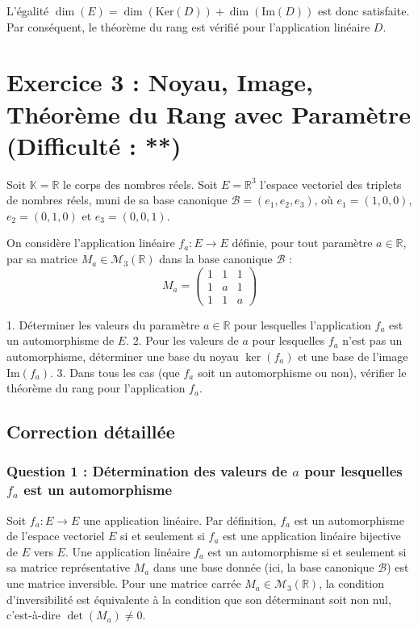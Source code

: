 \documentclass{report}
\begin{document}
    L'égalité $\dim(E) = \dim(\text{Ker}(D)) + \dim(\text{Im}(D))$ est donc satisfaite.
    Par conséquent, le théorème du rang est vérifié pour l'application linéaire $D$.

\newpage

\chapter*{Exercice 3 : Noyau, Image, Théorème du Rang avec Paramètre (Difficulté : **)}

Soit $\mathbb{K} = \mathbb{R}$ le corps des nombres réels.
Soit $E = \mathbb{R}^3$ l'espace vectoriel des triplets de nombres réels, muni de sa base canonique $\mathcal{B} = (e_1, e_2, e_3)$, où $e_1 = (1, 0, 0)$, $e_2 = (0, 1, 0)$ et $e_3 = (0, 0, 1)$.

On considère l'application linéaire $f_a: E \to E$ définie, pour tout paramètre $a \in \mathbb{R}$, par sa matrice $M_a \in \mathcal{M}_3(\mathbb{R})$ dans la base canonique $\mathcal{B}$ :
$$M_a = \begin{pmatrix} 1 & 1 & 1 \\ 1 & a & 1 \\ 1 & 1 & a \end{pmatrix}$$

1.  Déterminer les valeurs du paramètre $a \in \mathbb{R}$ pour lesquelles l'application $f_a$ est un automorphisme de $E$.
2.  Pour les valeurs de $a$ pour lesquelles $f_a$ n'est pas un automorphisme, déterminer une base du noyau $\ker(f_a)$ et une base de l'image $\text{Im}(f_a)$.
3.  Dans tous les cas (que $f_a$ soit un automorphisme ou non), vérifier le théorème du rang pour l'application $f_a$.

\section*{Correction détaillée}

\subsection*{Question 1 : Détermination des valeurs de $a$ pour lesquelles $f_a$ est un automorphisme}

Soit $f_a: E \to E$ une application linéaire. Par définition, $f_a$ est un automorphisme de l'espace vectoriel $E$ si et seulement si $f_a$ est une application linéaire bijective de $E$ vers $E$.
Une application linéaire $f_a$ est un automorphisme si et seulement si sa matrice représentative $M_a$ dans une base donnée (ici, la base canonique $\mathcal{B}$) est une matrice inversible.
Pour une matrice carrée $M_a \in \mathcal{M}_3(\mathbb{R})$, la condition d'inversibilité est équivalente à la condition que son déterminant soit non nul, c'est-à-dire $\det(M_a) \neq 0$.
\end{document}
